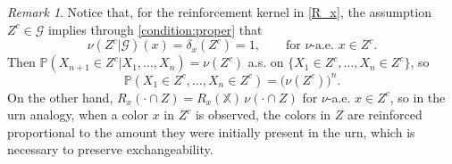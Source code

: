 \documentclass[a4paper]{article}
\theoremstyle{plain}
\theoremstyle{remark}
\newtheorem{remark}[theorem]{Remark}
\theoremstyle{definition}
\begin{document}
\begin{remark}\label{results:null:remark:Z^c}
Notice that, for the reinforcement kernel in \eqref{R_x}, the assumption $Z^c\in\mathcal{G}$ implies through \eqref{condition:proper} that
\[\nu(Z^c|\mathcal{G})(x)=\delta_x(Z^c)=1,\qquad\mbox{for }\nu\mbox{-a.e. }x\in Z^c.\]
Then $\mathbb{P}(X_{n+1}\in Z^c|X_1,\ldots,X_n)=\nu(Z^c)$ a.s. on $\{X_1\in Z^c,\ldots,X_n\in Z^c\}$, so
\[\mathbb{P}(X_1\in Z^c,\ldots,X_n\in Z^c)=\bigl(\nu(Z^c)\bigr)^n.\]
On the other hand, $R_x(\cdot\cap Z)=R_x(\mathbb{X})\,\nu(\cdot\cap Z)$ for $\nu$-a.e. $x\in Z^c$, so in the urn analogy, when a color $x$ in $Z^c$ is observed, the colors in $Z$ are reinforced proportional to the amount they were initially present in the urn, which is necessary to preserve exchangeability.
\end{remark}
\end{document}
